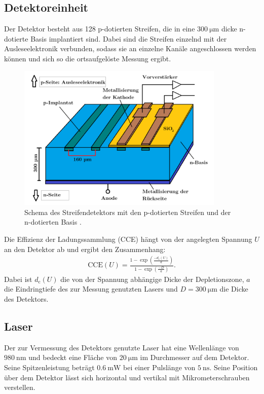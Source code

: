 \subsection{Detektoreinheit}
Der Detektor besteht aus 128 p-dotierten Streifen, die in eine $\SI{300}{\micro\meter}$ dicke n-dotierte Basis implantiert sind.
Dabei sind die Streifen einzelnd mit der Ausleseelektronik verbunden, sodass sie an einzelne Kanäle angeschlossen werden können und sich so die ortsaufgelöste Messung ergibt.
\begin{figure}
  \centering
  \includegraphics[height=7cm]{TimosAufrisse/detektorStreifen.png}
  \caption{Schema des Streifendetektors mit den p-dotierten Streifen und der n-dotierten Basis \cite{anleitung}.}
  \label{fig:detektorStreifen}
\end{figure}
Die Effizienz der Ladungssammlung (CCE) hängt von der angelegten Spannung $U$ an den Detektor ab und ergibt den Zusammenhang:
\begin{align}
  \text{CCE}(U) = \frac{1-\exp(\frac{-d_\text{c}(U)}{a})}{1-\exp(\frac{-D}{a})}.
\end{align}
Dabei ist $d_\text{c}(U)$ die von der Spannung abhängige Dicke der Depletionszone, $a$ die Eindringtiefe des zur Messung genutzten Lasers und $D = \SI{300}{\micro\meter}$ die Dicke des Detektors.

\subsection{Laser}
Der zur Vermessung des Detektors genutzte Laser hat eine Wellenlänge von $\SI{980}{\nano\meter}$ und bedeckt eine Fläche von $\SI{20}{\micro\meter}$ im Durchmesser auf dem Detektor. Seine Spitzenleistung beträgt $\SI{0.6}{\milli\watt}$ bei einer Pulslänge von $\SI{5}{\nano\second}$. Seine Position über dem Detektor lässt sich horizontal und vertikal mit Mikrometerschrauben verstellen.


